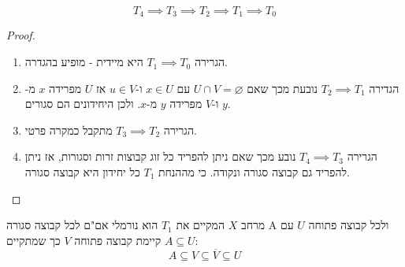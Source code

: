 \documentclass{tstextbook}
\begin{document}
\begin{proposition}
$$T_{4}\implies T_{3}\implies T_{2}\implies T_{1}\implies T_{0}$$

\end{proposition}
\begin{proof}
  \begin{enumerate}
    \item הגרירה \(T_{1}\implies T_{0}\) היא מיידית - מופיע בהגדרה. 


    \item הגדירה \(T_{2}\implies T_{1}\) נובעת מכך שאם \(U\cap V=\varnothing\) עם \(x \in U\) ו-\(u \in V\) אז \(U\) מפרידה \(x\) מ-\(y\) ו-\(V\) מפרידה \(y\) מ-\(x\). ולכן היחידונים הם סגורים. 


    \item הגרירה \(T_{3}\implies T_{2}\) מתקבל כמקרה פרטי. 


    \item הגרירה \(T_{4}\implies T_{3}\) נובע מכך שאם ניתן להפריד כל זוג קבוצות זרות וסגורות, אז ניתן להפריד גם קבוצה סגורה ונקודה. כי מההנחת \(T_{1}\) כל יחידון היא קבוצה סגורה. 


  \end{enumerate}
\end{proof}
\begin{proposition}
מרחב \(X\) המקיים את \(T_{1}\) הוא נורמלי אם"ם לכל קבוצה סגורה A ולכל קבוצה פתוחה \(U\) עם \(A\subseteq U\) קיימת קבוצה פתוחה \(V\) כך שמתקיים:
$$A\subseteq V\subseteq \overline{V} \subseteq U$$

\end{proposition}
\end{document}
